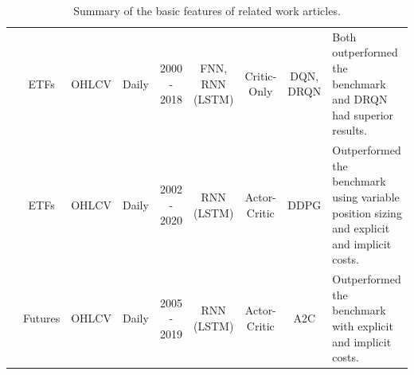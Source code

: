 \begin{table}
\begin{tabularx}{\linewidth}{@{}ccccccccX@{}}
\cite{chen_application_2019} & ETFs & OHLCV & Daily & 2000 - 2018 & \makecell{FNN, \\ RNN (LSTM)} & Critic-Only & \makecell{DQN, \\  DRQN} & Both outperformed the benchmark and DRQN had superior results. \\

\cite{jia_lstm-ddpg_2021} & ETFs & OHLCV & Daily & 2002 - 2020 & RNN (LSTM) & Actor-Critic & DDPG & Outperformed the benchmark using variable position sizing and explicit and implicit costs. \\

\cite{zhang_deep_2020} & Futures & OHLCV & Daily & 2005 - 2019 & RNN (LSTM) & Actor-Critic & A2C & Outperformed the benchmark with explicit and implicit costs. \\
 
\bottomrule
\end{tabularx}
\caption{Summary of the basic features of related work articles.}
\label{Tables:BasicRelatedWork}
\end{table}